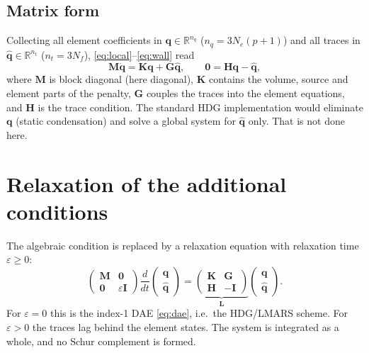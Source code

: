 \documentclass[11pt,a4paper]{article}
\newcommand{\qh}{\hat{\bm q}}
\newcommand{\q}{\bm q}
\begin{document}
\subsection{Matrix form}
Collecting all element coefficients in $\q\in\mathbb R^{n_q}$ ($n_q=3N_e(p+1)$) and all traces in
$\qh\in\mathbb R^{n_t}$ ($n_t=3N_f$), \eqref{eq:local}--\eqref{eq:wall} read
\begin{equation}\label{eq:dae}
\bm M\dot{\q} = \bm K\q+\bm G\qh,\qquad \bm 0 = \bm H\q-\qh ,
\end{equation}
where $\bm M$ is block diagonal (here diagonal), $\bm K$ contains the volume, source and element
parts of the penalty, $\bm G$ couples the traces into the element equations, and $\bm H$ is the
trace condition. The standard HDG implementation would eliminate $\q$ (static condensation) and
solve a global system for $\qh$ only. That is not done here.

\section{Relaxation of the additional conditions}
The algebraic condition is replaced by a relaxation equation with relaxation time $\varepsilon\ge0$:
\begin{equation}\label{eq:relax}
\boxed{\;
\begin{pmatrix}\bm M&\bm 0\\\bm 0&\varepsilon\bm I\end{pmatrix}
\frac{d}{dt}\begin{pmatrix}\q\\\qh\end{pmatrix}
=\underbrace{\begin{pmatrix}\bm K&\bm G\\\bm H&-\bm I\end{pmatrix}}_{\bm L}
\begin{pmatrix}\q\\\qh\end{pmatrix}.\;}
\end{equation}
For $\varepsilon=0$ this is the index-1 DAE \eqref{eq:dae}, i.e.\ the HDG/LMARS scheme. For
$\varepsilon>0$ the traces lag behind the element states. The system is integrated as a whole,
and no Schur complement is formed.
\end{document}

